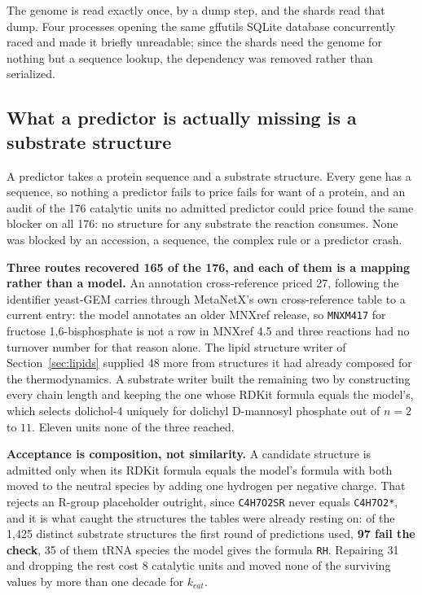 The genome is read exactly once, by a dump step, and the shards read that dump. Four
processes opening the same gffutils SQLite database concurrently raced and made it briefly
unreadable; since the shards need the genome for nothing but a sequence lookup, the
dependency was removed rather than serialized.

\subsection{What a predictor is actually missing is a substrate structure}
\label{sec:substrate-structures}

A predictor takes a protein sequence and a substrate structure. Every gene has a sequence,
so nothing a predictor fails to price fails for want of a protein, and an audit of the 176
catalytic units no admitted predictor could price found the same blocker on all 176: no
structure for any substrate the reaction consumes. None was blocked by an accession, a
sequence, the complex rule or a predictor crash.

\textbf{Three routes recovered 165 of the 176, and each of them is a mapping rather than a
model.} An annotation cross-reference priced 27, following the identifier yeast-GEM carries
through MetaNetX's own cross-reference table to a current entry: the model annotates an
older MNXref release, so \texttt{MNXM417} for fructose 1,6-bisphosphate is not a row in
MNXref 4.5 and three reactions had no turnover number for that reason alone. The lipid
structure writer of Section~\ref{sec:lipids} supplied 48 more from structures it had already
composed for the thermodynamics. A substrate writer built the remaining two by constructing
every chain length and keeping the one whose RDKit formula equals the model's, which selects
dolichol-4 uniquely for dolichyl D-mannosyl phosphate out of $n = 2$ to $11$. Eleven units
none of the three reached.

\textbf{Acceptance is composition, not similarity.} A candidate structure is admitted only
when its RDKit formula equals the model's formula with both moved to the neutral species by
adding one hydrogen per negative charge. That rejects an R-group placeholder outright, since
\texttt{C4H7O2SR} never equals \texttt{C4H7O2*}, and it is what caught the structures the
tables were already resting on: of the 1{,}425 distinct substrate structures the first round
of predictions used, \textbf{97 fail the check}, 35 of them tRNA species the model gives the
formula \texttt{RH}. Repairing 31 and dropping the rest cost 8 catalytic units and moved
none of the surviving values by more than one decade for $k_{cat}$.

